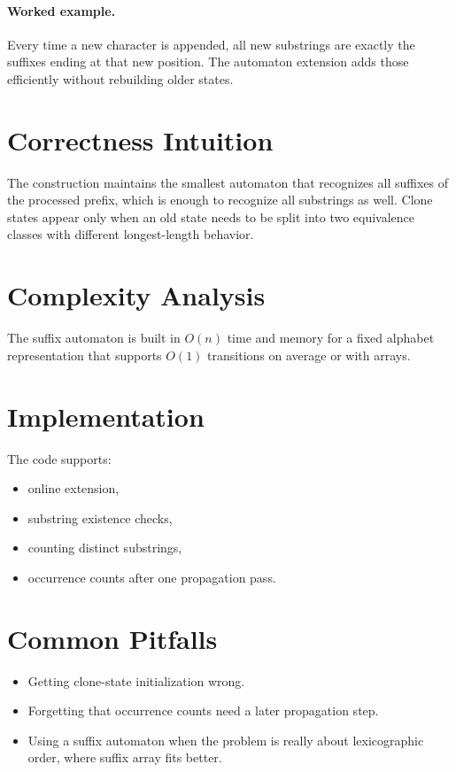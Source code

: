 \paragraph{Worked example.}
Every time a new character is appended, all new substrings are exactly the suffixes ending at that new position. The
automaton extension adds those efficiently without rebuilding older states.

\section*{Correctness Intuition}

The construction maintains the smallest automaton that recognizes all suffixes of the processed prefix, which is enough
to recognize all substrings as well. Clone states appear only when an old state needs to be split into two equivalence
classes with different longest-length behavior.

\section*{Complexity Analysis}

The suffix automaton is built in \(O(n)\) time and memory for a fixed alphabet representation that supports \(O(1)\)
transitions on average or with arrays.

\section*{Implementation}

The code supports:

\begin{itemize}
  \item online extension,
  \item substring existence checks,
  \item counting distinct substrings,
  \item occurrence counts after one propagation pass.
\end{itemize}

\section*{Common Pitfalls}

\begin{itemize}
  \item Getting clone-state initialization wrong.
  \item Forgetting that occurrence counts need a later propagation step.
  \item Using a suffix automaton when the problem is really about lexicographic order, where suffix array fits better.
\end{itemize}

